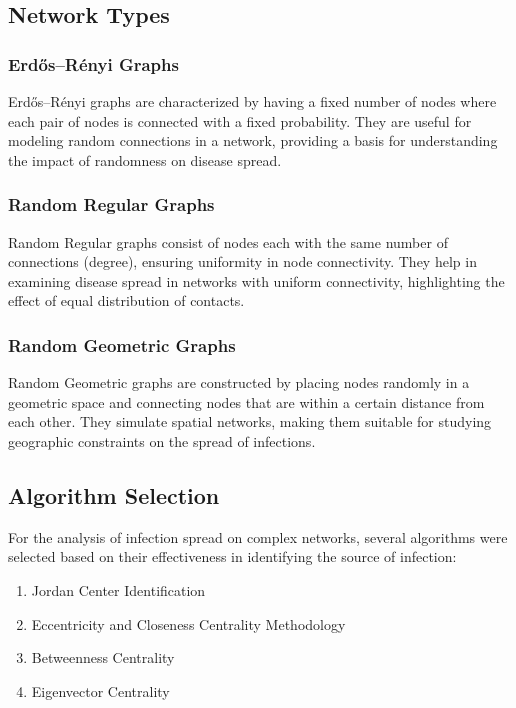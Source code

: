 \subsection{Network Types}

\subsubsection{Erdős–Rényi Graphs}
Erdős–Rényi graphs are characterized by having a fixed number of nodes where each pair of nodes is connected with a fixed probability. They are useful for modeling random connections in a network, providing a basis for understanding the impact of randomness on disease spread.

\subsubsection{Random Regular Graphs}
Random Regular graphs consist of nodes each with the same number of connections (degree), ensuring uniformity in node connectivity. They help in examining disease spread in networks with uniform connectivity, highlighting the effect of equal distribution of contacts.

\subsubsection{Random Geometric Graphs}
Random Geometric graphs are constructed by placing nodes randomly in a geometric space and connecting nodes that are within a certain distance from each other. They simulate spatial networks, making them suitable for studying geographic constraints on the spread of infections.

\subsection{Algorithm Selection}
For the analysis of infection spread on complex networks, several algorithms were selected based on their effectiveness in identifying the source of infection:

\begin{enumerate}
    \item Jordan Center Identification
    \item Eccentricity and Closeness Centrality Methodology
    \item Betweenness Centrality
    \item Eigenvector Centrality
\end{enumerate}

